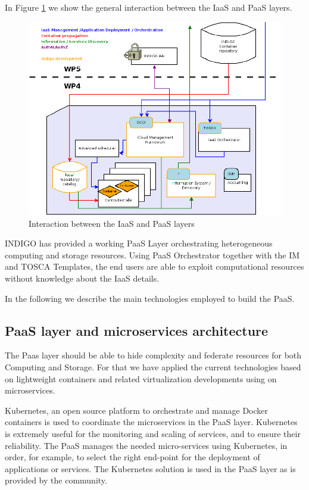 \documentclass{article}
\begin{document}
In Figure \ref{fig:2} we show the general interaction between the IaaS and PaaS layers. 



\begin{figure}
  \centering
  \includegraphics[width=\textwidth]{./figs/Figure2.pdf}
  \caption{Interaction between the IaaS and PaaS layers}
  \label{fig:2}
\end{figure}

INDIGO has provided a working PaaS Layer orchestrating heterogeneous computing and storage resources. Using PaaS Orchestrator together with the IM and TOSCA Templates, the end users are able to exploit computational resources without knowledge about the IaaS details. 

In the following we describe the main technologies employed to build the PaaS.  

\subsection{PaaS layer and microservices architecture}

The Paas layer should be able to hide complexity and federate resources for both Computing and Storage. For that we have applied the current technologies based on lightweight containers and related virtualization developments using on microservices. 

Kubernetes\cite{KUBERNETES}, an open source platform to orchestrate and manage Docker containers is  used to coordinate the microservices in the PaaS layer. Kubernetes is extremely useful for the monitoring and scaling of services, and to ensure their reliability. The PaaS manages the needed micro-services using Kubernetes, in order, for example, to select the right end-point for the deployment of applications or services.  The Kubernetes solution is used in the PaaS layer as is provided by the community. 
\end{document}
